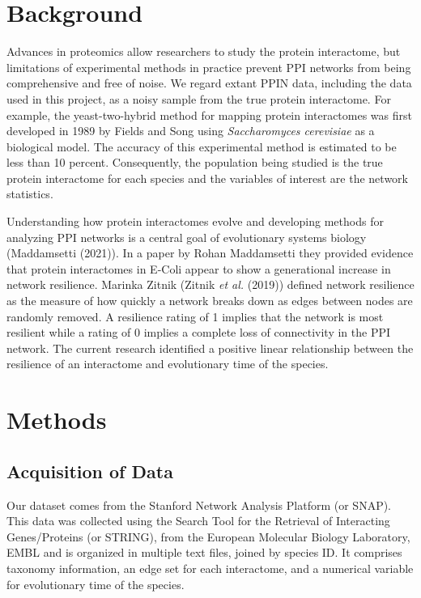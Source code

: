 \documentclass[12pt]{article}
\begin{document}
\section{Background}
Advances in proteomics allow researchers to study the protein interactome, but limitations of experimental methods in practice prevent PPI networks from being comprehensive and free of noise. We regard extant PPIN data, including the data used in this project, as a noisy sample from the true protein interactome. For example, the yeast-two-hybrid method for mapping protein interactomes was first developed in 1989 by Fields and Song using \textit{Saccharomyces cerevisiae} as a biological model. The accuracy of this experimental method is estimated to be less than 10 percent. Consequently, the population being studied is the true protein interactome for each species and the variables of interest are the network statistics.

Understanding how protein interactomes evolve and developing methods for analyzing PPI networks is a central goal of evolutionary systems biology (Maddamsetti (2021)). In a paper by Rohan Maddamsetti they provided evidence that protein interactomes in E-Coli appear to show a generational increase in network resilience. Marinka Zitnik (Zitnik \textit{et al.} (2019)) defined network resilience as the measure of how quickly a network breaks down as edges between nodes are randomly removed. A resilience rating of 1 implies that the network is most resilient while a rating of 0 implies a complete loss of connectivity in the PPI network. The current research identified a positive linear relationship between the resilience of an interactome and evolutionary time of the species.

\section{Methods}
\subsection{Acquisition of Data}
Our dataset comes from the Stanford Network Analysis Platform (or SNAP). This data was collected using the Search Tool for the Retrieval of Interacting Genes/Proteins (or STRING), from the European Molecular Biology Laboratory, EMBL and is organized in multiple text files, joined by species ID. It comprises taxonomy information, an edge set for each interactome, and a numerical variable for evolutionary time of the species.
\end{document}
